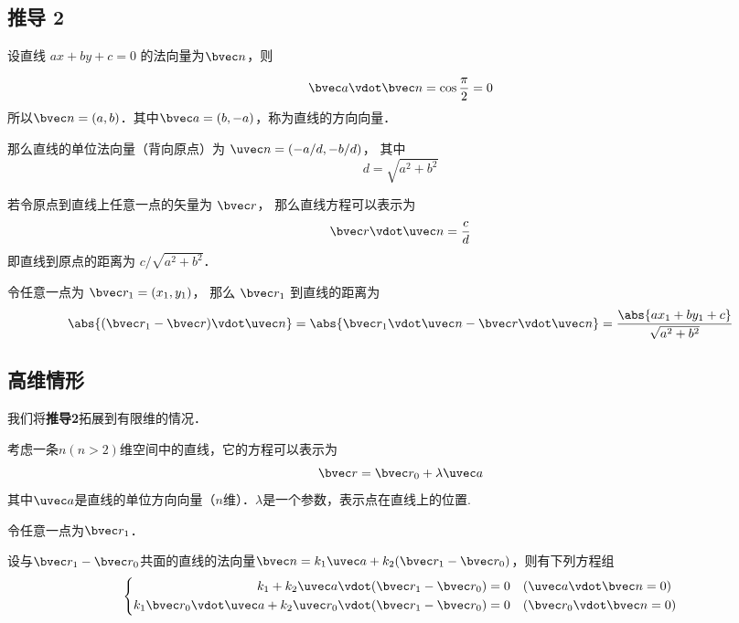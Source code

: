 \subsection{推导 2}

设直线 $ax + by + c = 0$ 的法向量为$\bvec n$，则

\begin{equation}
\bvec a \vdot \bvec n = \cos \frac{\pi}{2} = 0
\end{equation}
所以$\bvec n=(a,b)$．其中$\bvec a=(b,-a)$，称为直线的方向向量．

那么直线的单位法向量（背向原点）为 $\uvec n = (-a/d, -b/d)$， 其中
\begin{equation}
d = \sqrt{a^2 + b^2}
\end{equation}

若令原点到直线上任意一点的矢量为 $\bvec r$， 那么直线方程可以表示为
\begin{equation}
\bvec r \vdot \uvec n = \frac{c}{d}
\end{equation}
即直线到原点的距离为 $c/\sqrt{a^2 + b^2}$．

令任意一点为 $\bvec r_1 = (x_1, y_1)$， 那么 $\bvec r_1$ 到直线的距离为
\begin{equation}
\abs{(\bvec r_1 - \bvec r)\vdot \uvec n} = \abs{\bvec r_1\vdot \uvec n - \bvec r \vdot \uvec n}
= \frac{\abs{ax_1 + by_1 + c}}{\sqrt{a^2 + b^2}}
\end{equation}


 





\subsection{高维情形}


我们将\textbf{推导2}拓展到有限维的情况．

考虑一条$n(n>2)$维空间中的直线，它的方程可以表示为
\begin{equation}
\bvec r = \bvec r_0 + \lambda\uvec a
\end{equation}
其中$\uvec a$是直线的单位方向向量（$n$维）．$\lambda$是一个参数，表示点在直线上的位置.

令任意一点为$\bvec r_1$．

设与$\bvec r_1 - \bvec r_0$共面的直线的法向量$\bvec n=k_1 \uvec a + k_2 (\bvec r_1 - \bvec r_0)$，则有下列方程组
\begin{equation}
\left\lbrace
\begin{aligned}
k_1 + k_2 \uvec a \vdot (\bvec r_1 - \bvec r_0) &= 0 \quad (\uvec a \vdot \bvec n = 0)\\
k_1\bvec r_0\vdot\uvec a + k_2 \uvec r_0\vdot (\bvec r_1 - \bvec r_0) &= 0 \quad (\bvec r_0 \vdot \bvec n = 0)\\
\end{aligned}
\right.
\end{equation}

